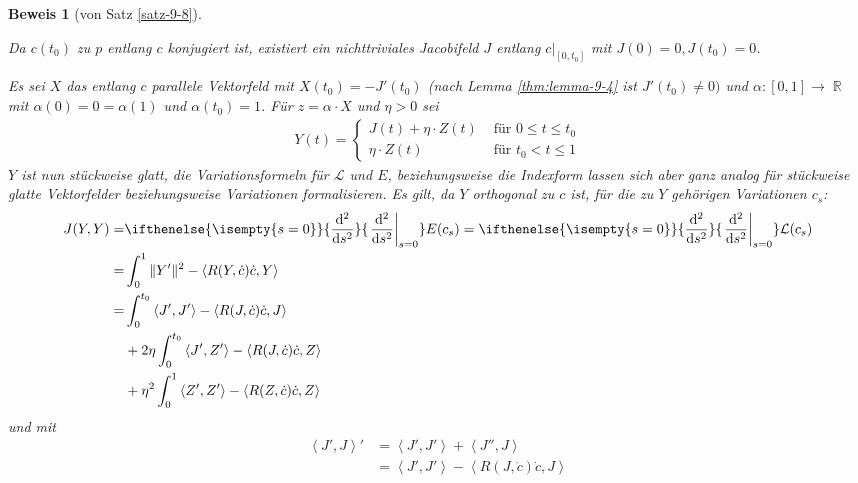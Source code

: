 \documentclass[paper=A4, twoside, chapterprefix=true, bibliography=totoc, headsepline]{scrbook}
\DeclareMathOperator{\R}{\mathbb{R}}
\newcommand{\dop}{\mathrm{d}}
\newcommand{\difffrac}[3][]{\ifthenelse{\isempty{#1}}{\frac{\dop #2}{\dop #3}}{\left. \frac{\dop #2}{\dop #3} \right|_{#1}}}
\theoremstyle{plain}
\theoremstyle{nonumberplain}
\newtheorem{bew}{Beweis}
\theoremstyle{empty}
\theoremstyle{break}
\begin{document}
\begin{bew}[von Satz \ref{satz-9-8}]
\begin{enumerate}[label=(\roman*),leftmargin=*,widest=ii]
\begin{description}

      \begin{description}[font=\normalfont\itshape]
      \item[Beweis der Existenz von $Y$:] Da $c(t_0)$ zu $p$ entlang $c$ konjugiert ist, existiert ein nichttriviales Jacobifeld $J$ entlang $c|_{[0,t_0]}$ mit $J(0) = 0, J(t_0) = 0$.
      \end{description}
      Es sei $X$ das entlang $c$ parallele Vektorfeld mit $X(t_0) = -J'(t_0)$
      (nach Lemma \ref{thm:lemma-9-4} ist $J'(t_0) \neq 0)$ und
      $\alpha\colon[0,1] \to \R$ mit $\alpha(0) = 0 = \alpha(1)$ und
      $\alpha(t_0) = 1$. F\"ur $z = \alpha \cdot X$ und $\eta > 0$ sei
      \begin{align*}
        Y(t) =
        \begin{cases}
          J(t) + \eta \cdot Z(t) & \text{ f\"ur } 0 \leq t \leq t_0\\
          \eta \cdot Z(t) & \text{ f\"ur } t_0 < t \leq 1
        \end{cases}
      \end{align*}
      $Y$ ist nun st\"uckweise glatt, die Variationsformeln f\"ur $\mathcal L$ und $E$, beziehungsweise die Indexform lassen sich aber ganz analog f\"ur st\"uckweise glatte Vektorfelder beziehungsweise Variationen formalisieren.
      Es gilt, da $Y$ orthogonal zu $c$ ist, f\"ur die zu $Y$ geh\"origen Variationen $c_s$:
      \begin{align*}
        J(Y,Y) = & \difffrac[s=0]{^2}{s^2}E(c_s) = \difffrac[s=0]{^2}{s^2} \mathcal L(c_s)\\
        = &{} \int_0^1\|Y'\|^2 - \left<R(Y,\dot c)\dot c,Y\right>\\
        = &{} \int_0^{t_0}\left<J',J'\right> - \left<R(J,\dot c)\dot c,J\right>\\ 
        &+ 2 \eta\int_0^{t_0} \left< J',Z'\right> - \left< R(J,\dot c)\dot c,Z\right>\\
        & + \eta^2 \int_0^1 \left<Z',Z'\right> - \left<R(Z,\dot c)\dot c,Z\right>
      \end{align*}
      und mit 
      \begin{align*}
        \left<J',J\right>' &= \left<J',J'\right> + \left<J'',J\right> \\
      	&= \left<J',J'\right> - \left<R(J,\dot c)\dot c,J\right>\\

\end{align*}
\end{description}
\end{enumerate}
\end{bew}
\end{document}
